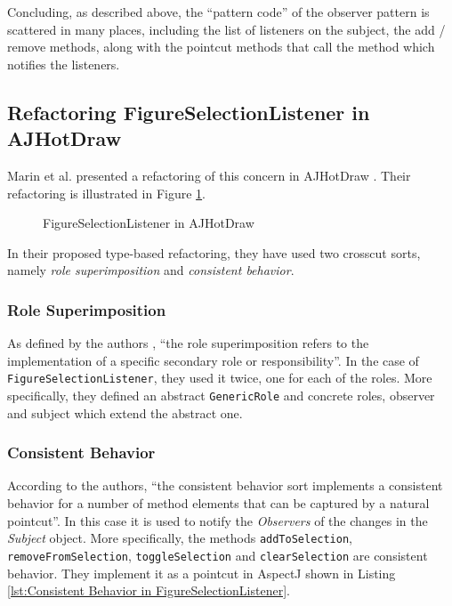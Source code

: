 Concluding, as described above, the ``pattern code'' of the observer pattern is scattered in many places, including the list of listeners on the subject, the add / remove methods, along with the pointcut methods that call the method which notifies the listeners.

\subsection{Refactoring FigureSelectionListener in AJHotDraw}
Marin et al. presented a refactoring of this concern in AJHotDraw \cite{marin2005approach}. 
Their refactoring is illustrated in Figure \ref{fig:JHotDraw_FigureSelectionListener_AOP}. 

\begin{figure}[H]
	\centering
  	\caption{FigureSelectionListener in AJHotDraw}
  	\label{fig:JHotDraw_FigureSelectionListener_AOP}
\end{figure}

In their proposed type-based refactoring, they have used two crosscut sorts, namely \textit{role superimposition} and \textit{consistent behavior}.

\subsubsection{Role Superimposition}
As defined by the authors \cite{marin2005classification}, ``the role superimposition refers to the implementation of a specific secondary role or responsibility''.
In the case of \texttt{FigureSelectionListener}, they used it twice, one for each of the roles.
More specifically, they defined an abstract \texttt{GenericRole} and concrete roles, observer and subject which extend the abstract one.

\subsubsection{Consistent Behavior}
According to the authors\cite{marin2005classification}, ``the consistent behavior sort implements a consistent behavior for a number of method elements that can be captured by a natural pointcut''.
In this case it is used to notify the \textit{Observers} of the changes in the \textit{Subject} object.
More specifically, the methods \texttt{addToSelection}, \texttt{removeFromSelection}, \texttt{toggleSelection} and \texttt{clearSelection} are consistent behavior.
They implement it as a pointcut in AspectJ shown in Listing \ref{lst:Consistent Behavior in FigureSelectionListener}.


